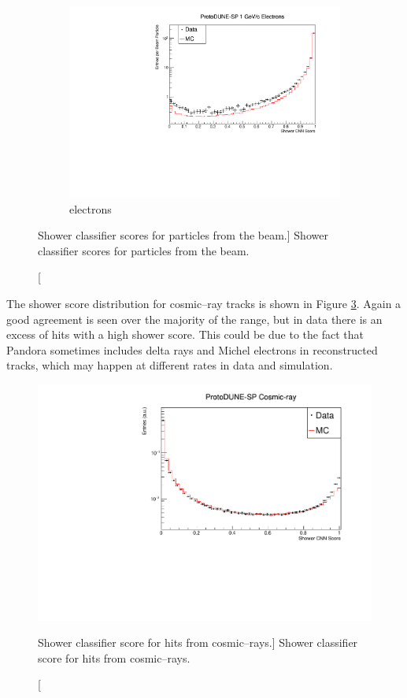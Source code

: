 \begin{figure}
	\begin{subfigure}[b]{0.7\textwidth}
		\centering
		\includegraphics[width=\textwidth]{figures/hit_cnn_electron.pdf}
		\caption {electrons}
		\label{fig:beam_electron_cnn}
	\end{subfigure}

	\caption
	[Shower classifier scores for particles from the \protodune{} beam.]
	{Shower classifier scores for particles from the \protodune{} beam.}

	\label{fig:cnn_scores_beam}

\end{figure}

The shower score distribution for cosmic--ray tracks is shown in Figure
\ref{fig:cosmic_muon_cnn}. Again a good agreement is seen over the majority of
the range, but in data there is an excess of hits with a high shower score. This
could be due to the fact that Pandora sometimes includes delta rays and Michel
electrons in reconstructed tracks, which may happen at different rates in data
and simulation.
\begin{figure}
	\centering
	\includegraphics[width=\textwidth]{figures/hit_cnn_cosmics.pdf}
	\caption
	[Shower classifier score for hits from cosmic--rays.]
	{Shower classifier score for hits from cosmic--rays.}
	\label{fig:cosmic_muon_cnn}
\end{figure}

